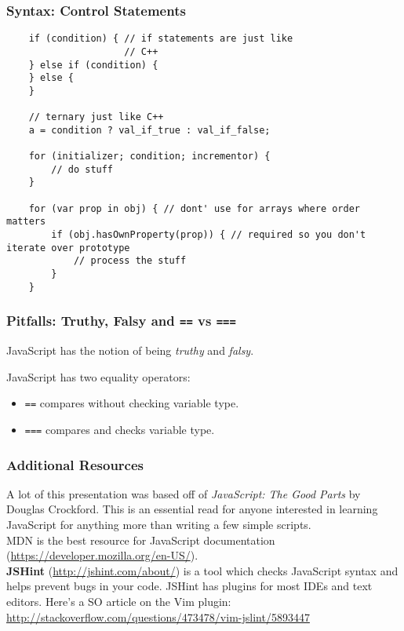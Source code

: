 \documentclass{lug}
\begin{document}
\begin{frame}[fragile]
    \frametitle{Syntax: Control Statements}

    \begin{verbatim}
    if (condition) { // if statements are just like
                     // C++
    } else if (condition) {
    } else {
    }

    // ternary just like C++
    a = condition ? val_if_true : val_if_false;

    for (initializer; condition; incrementor) {
        // do stuff
    }

    for (var prop in obj) { // dont' use for arrays where order matters
        if (obj.hasOwnProperty(prop)) { // required so you don't iterate over prototype
            // process the stuff
        }
    }
    \end{verbatim}
\end{frame}


\begin{frame}
    \frametitle{Pitfalls: Truthy, Falsy and \texttt{==} vs \texttt{===}}

    JavaScript has the notion of being \textit{truthy} and \textit{falsy}.

    JavaScript has two equality operators:
    \begin{itemize}
        \item \texttt{==} compares without checking variable type.
        \item \texttt{===} compares and checks variable type.
    \end{itemize}
\end{frame}

\begin{frame}
    \frametitle{Additional Resources}

    A lot of this presentation was based off of \textit{JavaScript: The Good Parts} by Douglas
    Crockford. This is an essential read for anyone interested in learning JavaScript for anything
    more than writing a few simple scripts.\\

    MDN is the best resource for JavaScript documentation
    (\url{https://developer.mozilla.org/en-US/}). \\

    \textbf{JSHint} (\url{http://jshint.com/about/}) is a tool which checks JavaScript syntax and
    helps prevent bugs in your code. JSHint has plugins for most IDEs and text editors. Here's a SO
    article on the Vim plugin: \url{http://stackoverflow.com/questions/473478/vim-jslint/5893447}\\

\end{frame}
\end{document}
